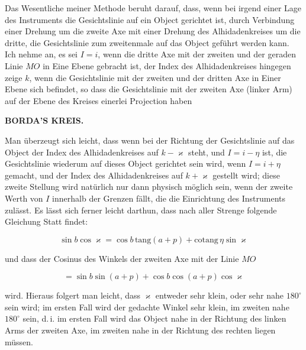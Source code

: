 \par\indent Das Wesentliche meiner Methode beruht darauf, dass, wenn bei irgend einer Lage des Instruments die Gesichtslinie auf ein Object gerichtet ist, durch Verbindung einer Drehung um die zweite Axe mit einer Drehung des Alhidadenkreises um die dritte, die Gesichtslinie zum zweitenmale auf das Object geführt werden kann. Ich nehme an, es sei $I = i$, wenn die dritte Axe mit der zweiten und der geraden Linie $MO$ in Eine Ebene gebracht ist, der Index des Alhidadenkreises hingegen zeige $k$, wenn die Gesichtslinie mit der zweiten und der dritten Axe in Einer Ebene sich befindet, so dass die Gesichtslinie mit der zweiten Axe (linker Arm) auf der Ebene des Kreises einerlei Projection haben
\par
{}
\thispagestyle{gaussVIGathering77}
\clearpage
\thispagestyle{empty}
\noindent{}%
%
\parbox[t]{\dimexpr\linewidth-24mm\relax}{\centering\footnotesize\bfseries BORDA’S KREIS.\par}%
\makebox[12mm][r]{}\par\nobreak\medskip
\noindent Man überzeugt sich leicht, dass wenn bei der Richtung der Gesichtslinie auf das Object der Index des Alhidadenkreises auf $k-\varkappa$ steht, und $I=i-\eta$ ist, die Gesichtslinie wiederum auf dieses Object gerichtet sein wird, wenn $I=i+\eta$ gemacht, und der Index des Alhidadenkreises auf $k+\varkappa$ gestellt wird; diese zweite Stellung wird natürlich nur dann physisch möglich sein, wenn der zweite Werth von $I$ innerhalb der Grenzen fällt, die die Einrichtung des Instruments zulässt. Es lässt sich ferner leicht darthun, dass nach aller Strenge folgende Gleichung Statt findet:

\[ \sin b \cos\varkappa = \cos b\, \mathrm{tang}(a+p) + \mathrm{cotang}\,\eta \sin\varkappa \]

\noindent und dass der Cosinus des Winkels der zweiten Axe mit der Linie $MO$

\[ = \sin b \sin(a+p) + \cos b \cos(a+p) \cos\varkappa \]

\noindent wird. Hieraus folgert man leicht, dass $\varkappa$ entweder sehr klein, oder sehr nahe $180^\circ$ sein wird; im ersten Fall wird der gedachte Winkel sehr klein, im zweiten nahe $180^\circ$ sein, d.\,i. im ersten Fall wird das Object nahe in der Richtung des linken Arms der zweiten Axe, im zweiten nahe in der Richtung des rechten liegen müssen.

